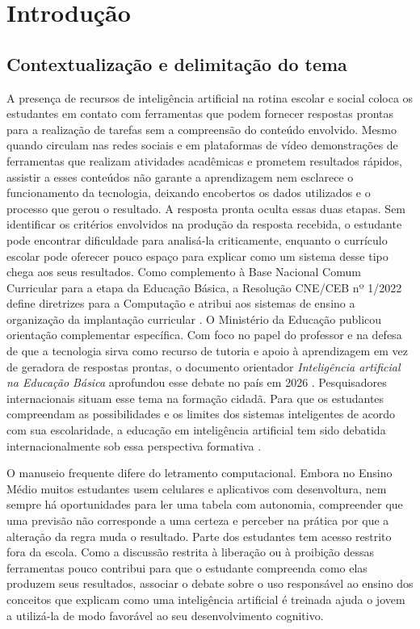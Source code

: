 \chapter{Introdução}

\section{Contextualização e delimitação do tema}

A presença de recursos de inteligência artificial na rotina escolar e social coloca os estudantes em contato com ferramentas que podem fornecer respostas prontas para a realização de tarefas sem a compreensão do conteúdo envolvido. Mesmo quando circulam nas redes sociais e em plataformas de vídeo demonstrações de ferramentas que realizam atividades acadêmicas e prometem resultados rápidos, assistir a esses conteúdos não garante a aprendizagem nem esclarece o funcionamento da tecnologia, deixando encobertos os dados utilizados e o processo que gerou o resultado. A resposta pronta oculta essas duas etapas. Sem identificar os critérios envolvidos na produção da resposta recebida, o estudante pode encontrar dificuldade para analisá-la criticamente, enquanto o currículo escolar pode oferecer pouco espaço para explicar como um sistema desse tipo chega aos seus resultados. Como complemento à Base Nacional Comum Curricular para a etapa da Educação Básica, a Resolução CNE/CEB nº 1/2022 define diretrizes para a Computação e atribui aos sistemas de ensino a organização da implantação curricular \cite{brasil2022computacao}. O Ministério da Educação publicou orientação complementar específica. Com foco no papel do professor e na defesa de que a tecnologia sirva como recurso de tutoria e apoio à aprendizagem em vez de geradora de respostas prontas, o documento orientador \textit{Inteligência artificial na Educação Básica} aprofundou esse debate no país em 2026 \cite{brasil2026iaeducacaobasica}. Pesquisadores internacionais situam esse tema na formação cidadã. Para que os estudantes compreendam as possibilidades e os limites dos sistemas inteligentes de acordo com sua escolaridade, a educação em inteligência artificial tem sido debatida internacionalmente sob essa perspectiva formativa \cite{touretzky2019envisioning}.

O manuseio frequente difere do letramento computacional. Embora no Ensino Médio muitos estudantes usem celulares e aplicativos com desenvoltura, nem sempre há oportunidades para ler uma tabela com autonomia, compreender que uma previsão não corresponde a uma certeza e perceber na prática por que a alteração da regra muda o resultado. Parte dos estudantes tem acesso restrito fora da escola. Como a discussão restrita à liberação ou à proibição dessas ferramentas pouco contribui para que o estudante compreenda como elas produzem seus resultados, associar o debate sobre o uso responsável ao ensino dos conceitos que explicam como uma inteligência artificial é treinada ajuda o jovem a utilizá-la de modo favorável ao seu desenvolvimento cognitivo.

